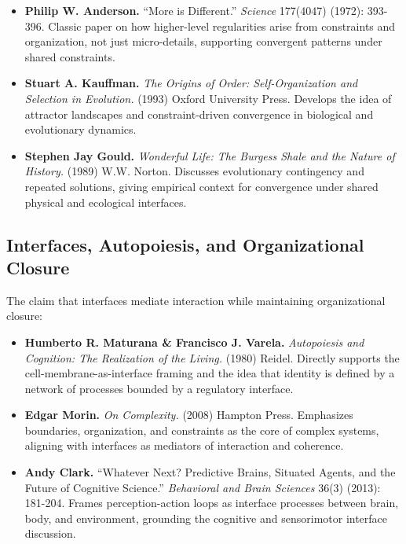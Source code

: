 \documentclass[
  openright]{book}
\begin{document}
\begin{itemize}
\item
  \textbf{Philip W. Anderson.} ``More is Different.'' \emph{Science}
  177(4047) (1972): 393-396. Classic paper on how higher-level
  regularities arise from constraints and organization, not just
  micro-details, supporting convergent patterns under shared
  constraints.
\item
  \textbf{Stuart A. Kauffman.} \emph{The Origins of Order:
  Self-Organization and Selection in Evolution.} (1993) Oxford
  University Press. Develops the idea of attractor landscapes and
  constraint-driven convergence in biological and evolutionary dynamics.
\item
  \textbf{Stephen Jay Gould.} \emph{Wonderful Life: The Burgess Shale
  and the Nature of History.} (1989) W.W. Norton. Discusses evolutionary
  contingency and repeated solutions, giving empirical context for
  convergence under shared physical and ecological interfaces.
\end{itemize}

\subsection{Interfaces, Autopoiesis, and Organizational
Closure}\label{interfaces-autopoiesis-and-organizational-closure}

The claim that interfaces mediate interaction while maintaining
organizational closure:

\begin{itemize}
\item
  \textbf{Humberto R. Maturana \& Francisco J. Varela.}
  \emph{Autopoiesis and Cognition: The Realization of the Living.}
  (1980) Reidel. Directly supports the cell-membrane-as-interface
  framing and the idea that identity is defined by a network of
  processes bounded by a regulatory interface.
\item
  \textbf{Edgar Morin.} \emph{On Complexity.} (2008) Hampton Press.
  Emphasizes boundaries, organization, and constraints as the core of
  complex systems, aligning with interfaces as mediators of interaction
  and coherence.
\item
  \textbf{Andy Clark.} ``Whatever Next? Predictive Brains, Situated
  Agents, and the Future of Cognitive Science.'' \emph{Behavioral and
  Brain Sciences} 36(3) (2013): 181-204. Frames perception-action loops
  as interface processes between brain, body, and environment, grounding
  the cognitive and sensorimotor interface discussion.
\end{itemize}
\end{document}
